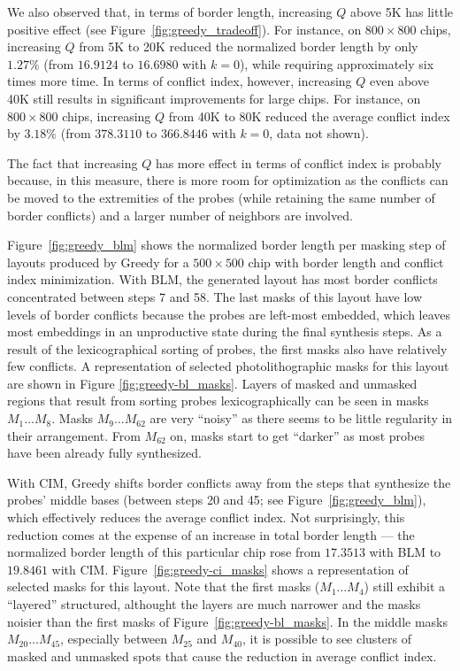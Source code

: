 We also observed that, in terms of border length, increasing $Q$ above 5K has
little positive effect (see Figure~\ref{fig:greedy_tradeoff}). For instance, on
$800\times 800$ chips, increasing $Q$ from 5K to 20K reduced the normalized
border length by only $1.27\%$ (from $16.9124$ to $16.6980$ with $k=0$), while
requiring approximately six times more time. In terms of conflict index,
however, increasing $Q$ even above 40K still results in significant improvements
for large chips. For instance, on $800\times 800$ chips, increasing $Q$ from 40K
to 80K reduced the average conflict index by $3.18\%$ (from $378.3110$ to
$366.8446$ with $k=0$, data not shown).

The fact that increasing $Q$ has more effect in terms of conflict index is
probably because, in this measure, there is more room for optimization as the
conflicts can be moved to the extremities of the probes (while retaining the
same number of border conflicts) and a larger number of neighbors are involved.

Figure~\ref{fig:greedy_blm} shows the normalized border length per masking step
of layouts produced by Greedy for a $500\times 500$ chip with border length and
conflict index minimization. With BLM, the generated layout has most border
conflicts concentrated between steps 7 and 58. The last masks of this layout
have low levels of border conflicts because the probes are left-most embedded,
which leaves most embeddings in an unproductive state during the final synthesis
steps. As a result of the lexicographical sorting of probes, the first masks
also have relatively few conflicts. A representation of selected
photolithographic masks for this layout are shown in Figure
\ref{fig:greedy-bl_masks}. Layers of masked and unmasked regions that result
from sorting probes lexicographically can be seen in masks $M_1 \dots M_8$.
Masks $M_9 \dots M_{62}$ are very ``noisy'' as there seems to be little
regularity in their arrangement. From $M_{62}$ on, masks start to get ``darker''
as most probes have been already fully synthesized.

With CIM, Greedy shifts border conflicts away from the steps that synthesize the
probes' middle bases (between steps 20 and 45; see Figure~\ref{fig:greedy_blm}),
which effectively reduces the average conflict index. Not surprisingly, this
reduction comes at the expense of an increase in total border length --- the
normalized border length of this particular chip rose from $17.3513$ with BLM to
$19.8461$ with CIM. Figure~\ref{fig:greedy-ci_masks} shows a representation of
selected masks for this layout. Note that the first masks ($M_1 \dots M_4$)
still exhibit a ``layered'' structured, althought the layers are much narrower
and the masks noisier than the first masks of Figure~\ref{fig:greedy-bl_masks}.
In the middle masks $M_{20} \dots M_{45}$, especially between $M_{25}$ and
$M_{40}$, it is possible to see clusters of masked and unmasked spots that cause
the reduction in average conflict index.

